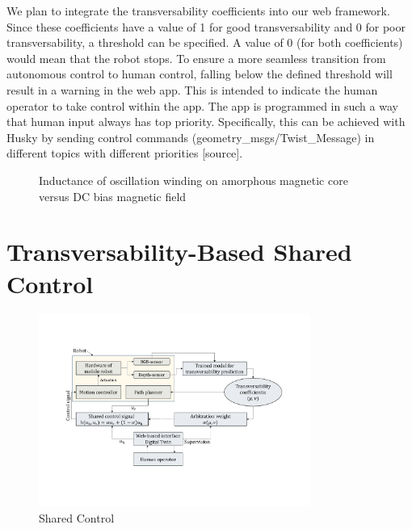 \documentclass[letterpaper, 10 pt, conference]{ieeeconf}  %
\begin{document}
We plan to integrate the transversability coefficients into our web framework. Since these coefficients have a value of 1 for good transversability and 0 for poor transversability, a threshold can be specified. 
A value of 0 (for both coefficients) would mean that the robot stops. To ensure a more seamless transition from autonomous control to human control, falling below the defined threshold will result in a warning in the web app.
This is intended to indicate the human operator to take control within the app. The app is programmed in such a way that human input always has top priority. Specifically, this can be achieved with Husky by sending control commands (geometry\_msgs/Twist\_Message) in different topics with different priorities [source]. 




   \begin{figure}[thpb]
      \centering
      \caption{Inductance of oscillation winding on amorphous
       magnetic core versus DC bias magnetic field}
      \label{figurelabel}
   \end{figure}
   


\section{Transversability-Based Shared Control}
\begin{figure}[htbp]
	\centerline{\includegraphics[width=8.9cm]{images/transversability.pdf}}
	\caption{Shared Control}
	\label{fig:sharedcontrol}
\end{figure}
\end{document}
